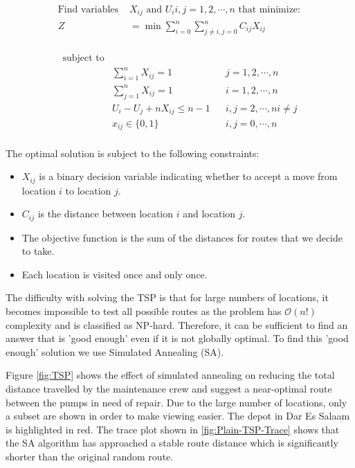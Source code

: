 \documentclass{article} %
\begin{document}
\begin{multicols}{2}
\begin{align*}
\textrm{Find variables }& X_{ij}  \textrm{ and } U_i i,j = 1, 2, \cdots , n \textrm{ that minimize}:\\
Z &= \min \sum_{i=0}^n \sum_{j\ne i,j=0}^n C_{ij} X_{ij}\\
\end{align*}

\begin{align*}
\textrm{subject to} & \\
	& \sum_{i=1}^n X_{ij} = 1 && j = 1, 2 , \cdots, n \\
	& \sum_{j=1}^n X_{ij} = 1 && i = 1, 2, \cdots, n \\
	&U_i - U_j + nX_{ij} \le n-1 && i, j = 2, \cdots, n i\ne j \\
	& x_{ij} \in \{0, 1\} && i,j=0, \cdots, n \\
\end{align*}

The optimal solution is subject to the following constraints:

\begin{itemize}
  \item $X_{ij}$ is a binary decision variable indicating whether to accept a move from location $i$ to location $j$.
  \item $C_{ij}$ is the distance between location $i$ and location $j$.
  \item The objective function is the sum of the distances for routes that we decide to take.
  \item Each location is visited once and only once.
\end{itemize}

The difficulty with solving the TSP is that for large numbers of locations, it becomes impossible to test all possible routes as the problem has $\mathcal{O}$$(n!)$ complexity and is classified as NP-hard. Therefore, it can be sufficient to find an answer that is 'good enough' even if it is not globally optimal. To find  this 'good enough' solution we use Simulated Annealing (SA). 

Figure \ref{fig:TSP} shows the effect of simulated annealing on reducing the total distance travelled by the maintenance crew and suggest a near-optimal route between the pumps in need of repair. Due to the large number of locations, only a subset are shown in order to make viewing easier. The depot in Dar Es Salaam is highlighted in red. The trace plot shown in \ref{fig:Plain-TSP-Trace} shows that the SA algorithm has approached a stable route distance which is significantly shorter than the original random route.


\end{multicols}
\end{document}
